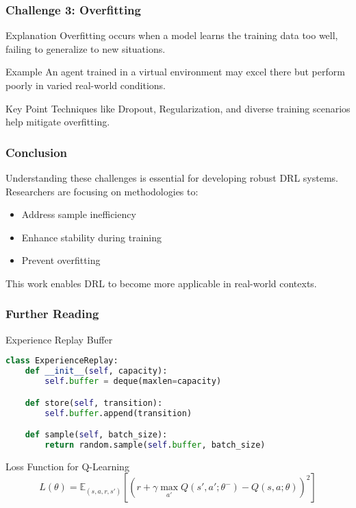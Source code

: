 \documentclass[aspectratio=169]{beamer}
\begin{document}
\begin{frame}[fragile]
    \frametitle{Challenge 3: Overfitting}
    \begin{block}{Explanation}
        Overfitting occurs when a model learns the training data too well, failing to generalize to new situations.
    \end{block}
    \begin{exampleblock}{Example}
        An agent trained in a virtual environment may excel there but perform poorly in varied real-world conditions.
    \end{exampleblock}
    \begin{block}{Key Point}
        Techniques like Dropout, Regularization, and diverse training scenarios help mitigate overfitting.
    \end{block}
\end{frame}

\begin{frame}[fragile]
    \frametitle{Conclusion}
    Understanding these challenges is essential for developing robust DRL systems. Researchers are focusing on methodologies to:
    \begin{itemize}
        \item Address sample inefficiency
        \item Enhance stability during training
        \item Prevent overfitting
    \end{itemize}
    This work enables DRL to become more applicable in real-world contexts.
\end{frame}

\begin{frame}[fragile]
    \frametitle{Further Reading}
    \begin{block}{Experience Replay Buffer}
        \begin{lstlisting}[language=python]
class ExperienceReplay:
    def __init__(self, capacity):
        self.buffer = deque(maxlen=capacity)

    def store(self, transition):
        self.buffer.append(transition)

    def sample(self, batch_size):
        return random.sample(self.buffer, batch_size)
        \end{lstlisting}
    \end{block}
    
    \begin{block}{Loss Function for Q-Learning}
        \begin{equation}
        L(\theta) = \mathbb{E}_{(s,a,r,s')} \left[ (r + \gamma \max_{a'} Q(s', a'; \theta^-) - Q(s, a; \theta))^2 \right]
        \end{equation}
    \end{block}
\end{frame}
\end{document}
